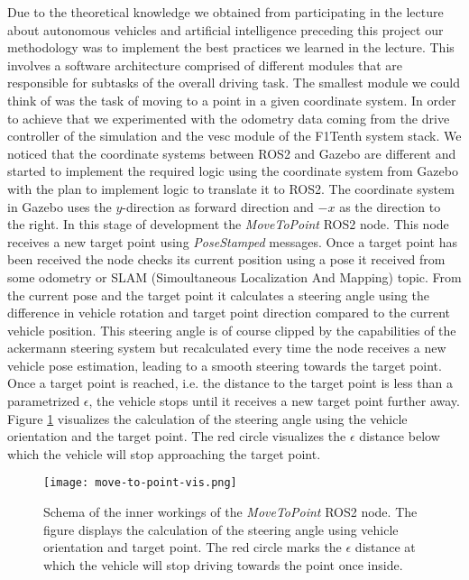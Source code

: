 Due to the theoretical knowledge we obtained from participating in the lecture about autonomous vehicles and artificial intelligence preceding this project our methodology was to implement the best practices we learned in the lecture. This involves a software architecture comprised of different modules that are responsible for subtasks of the overall driving task. The smallest module we could think of was the task of moving to a point in a given coordinate system. In order to achieve that we experimented with the odometry data coming from the drive controller of the simulation and the vesc module of the F1Tenth system stack. We noticed that the coordinate systems between ROS2 and Gazebo are different and started to implement the required logic using the coordinate system from Gazebo with the plan to implement logic to translate it to ROS2. The coordinate system in Gazebo uses the $y$-direction as forward direction and $-x$ as the direction to the right. In this stage of development the \textit{MoveToPoint} ROS2 node. This node receives a new target point using \textit{PoseStamped} messages. Once a target point has been received the node checks its current position using a pose it received from some odometry or SLAM (Simoultaneous Localization And Mapping) topic. From the current pose and the target point it calculates a steering angle using the difference in vehicle rotation and target point direction compared to the current vehicle position. This steering angle is of course clipped by the capabilities of the ackermann steering system but recalculated every time the node receives a new vehicle pose estimation, leading to a smooth steering towards the target point. Once a target point is reached, i.e. the distance to the target point is less than a parametrized $\epsilon$, the vehicle stops until it receives a new target point further away.
Figure \ref{fig:move-to-point} visualizes the calculation of the steering angle using the vehicle orientation and the target point. The red circle visualizes the $\epsilon$ distance below which the vehicle will stop approaching the target point.

\begin{figure}[ht]
\vskip 0.2in
\begin{center}
\centerline{\texttt{[image: move-to-point-vis.png]}}
\caption{Schema of the inner workings of the \textit{MoveToPoint} ROS2 node. The figure displays the calculation of the steering angle using vehicle orientation and target point. The red circle marks the $\epsilon$ distance at which the vehicle will stop driving towards the point once inside.}
\label{fig:move-to-point}
\end{center}
\vskip -0.2in
\end{figure}

